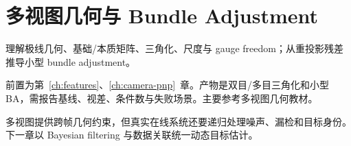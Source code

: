 \chapter{多视图几何与 Bundle Adjustment}
\label{ch:multiview}

\begin{learningobjectives}
理解极线几何、基础/本质矩阵、三角化、尺度与 gauge freedom；从重投影残差推导小型 bundle adjustment。
\end{learningobjectives}

\begin{prerequisites}
前置为第~\ref{ch:features}、\ref{ch:camera-pnp}~章。产物是双目/多目三角化和小型 BA，需报告基线、视差、条件数与失败场景。主要参考多视图几何教材\cite{hartley2004multiple}。
\end{prerequisites}


\begin{chaptertransition}
多视图提供跨帧几何约束，但真实在线系统还要递归处理噪声、漏检和目标身份。下一章以 Bayesian filtering 与数据关联统一动态目标估计。
\end{chaptertransition}
